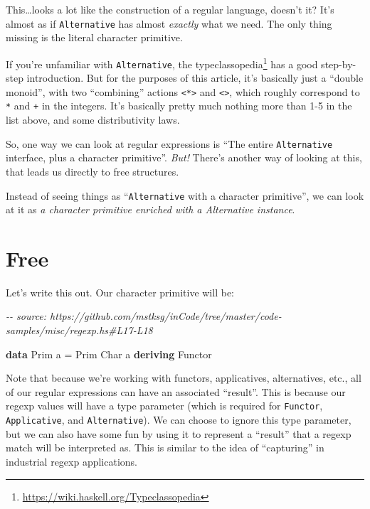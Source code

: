 \documentclass[]{article}
\newenvironment{Shaded}{}{}
\newcommand{\CommentTok}[1]{\textcolor[rgb]{0.38,0.63,0.69}{\textit{#1}}}
\newcommand{\DataTypeTok}[1]{\textcolor[rgb]{0.56,0.13,0.00}{#1}}
\newcommand{\KeywordTok}[1]{\textcolor[rgb]{0.00,0.44,0.13}{\textbf{#1}}}
\newcommand{\NormalTok}[1]{#1}
\newcommand{\OtherTok}[1]{\textcolor[rgb]{0.00,0.44,0.13}{#1}}
\renewcommand{\href}[2]{#2\footnote{\url{#1}}}
\begin{document}
This\ldots looks a lot like the construction of a regular language, doesn't it?
It's almost as if \texttt{Alternative} has almost \emph{exactly} what we need.
The only thing missing is the literal character primitive.

If you're unfamiliar with \texttt{Alternative}, the
\href{https://wiki.haskell.org/Typeclassopedia}{typeclassopedia} has a good
step-by-step introduction. But for the purposes of this article, it's basically
just a ``double monoid'', with two ``combining'' actions
\texttt{\textless{}*\textgreater{}} and
\texttt{\textless{}\textbar{}\textgreater{}}, which roughly correspond to
\texttt{*} and \texttt{+} in the integers. It's basically pretty much nothing
more than 1-5 in the list above, and some distributivity laws.

So, one way we can look at regular expressions is ``The entire
\texttt{Alternative} interface, plus a character primitive''. \emph{But!}
There's another way of looking at this, that leads us directly to free
structures.

Instead of seeing things as ``\texttt{Alternative} with a character primitive'',
we can look at it as \emph{a character primitive enriched with a Alternative
instance}.

\hypertarget{free}{%
\section{Free}\label{free}}

Let's write this out. Our character primitive will be:

\begin{Shaded}
\begin{Highlighting}[]
\CommentTok{{-}{-} source: https://github.com/mstksg/inCode/tree/master/code{-}samples/misc/regexp.hs\#L17{-}L18}

\KeywordTok{data} \DataTypeTok{Prim}\NormalTok{ a }\OtherTok{=} \DataTypeTok{Prim} \DataTypeTok{Char}\NormalTok{ a}
  \KeywordTok{deriving} \DataTypeTok{Functor}
\end{Highlighting}
\end{Shaded}

Note that because we're working with functors, applicatives, alternatives, etc.,
all of our regular expressions can have an associated ``result''. This is
because our regexp values will have a type parameter (which is required for
\texttt{Functor}, \texttt{Applicative}, and \texttt{Alternative}). We can choose
to ignore this type parameter, but we can also have some fun by using it to
represent a ``result'' that a regexp match will be interpreted as. This is
similar to the idea of ``capturing'' in industrial regexp applications.
\end{document}
